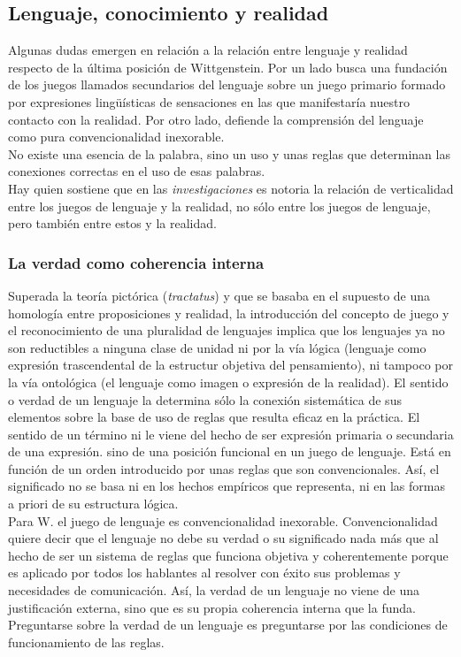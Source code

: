 \documentclass[a4paper, 11pt, twocolumn, spanish]{article}
\begin{document}
\subsection{Lenguaje, conocimiento y realidad}
\label{sec:org9010ed5}
Algunas dudas emergen en relación a la relación entre lenguaje y
realidad respecto de la última posición de Wittgenstein. Por un lado
busca una fundación de los juegos llamados secundarios del lenguaje
sobre un juego primario formado por expresiones lingüísticas de
sensaciones en las que manifestaría nuestro contacto con la
realidad. Por otro lado, defiende la comprensión del lenguaje como
pura convencionalidad inexorable.\\

No existe una esencia de la palabra, sino un uso y unas reglas que
determinan las conexiones correctas en el uso de esas palabras.\\

Hay quien sostiene que en las \emph{investigaciones} es notoria la relación
de verticalidad entre los juegos de lenguaje y la realidad, no sólo
entre los juegos de lenguaje, pero también entre estos y la realidad.

\subsubsection{La verdad como coherencia interna}
\label{sec:orgb2b2f4d}
Superada la teoría pictórica (\emph{tractatus}) y que se basaba en el
supuesto de una homología entre proposiciones y realidad, la
introducción del concepto de juego y el reconocimiento de una
pluralidad de lenguajes implica que los lenguajes ya no son
reductibles a ninguna clase de unidad ni por la vía lógica (lenguaje
como expresión trascendental de la estructur objetiva del
pensamiento), ni tampoco por la vía ontológica (el lenguaje como
imagen o expresión de la realidad). El sentido o verdad de un lenguaje
la determina sólo la conexión sistemática de sus elementos sobre la
base de uso de reglas que resulta eficaz en la práctica. El sentido de
un término ni le viene del hecho de ser expresión primaria o
secundaria de una expresión. sino de una posición funcional en un
juego de lenguaje. Está en función de un orden introducido por unas
reglas que son convencionales. Así, el significado no se basa ni en
los hechos empíricos que representa, ni en las formas a priori de su
estructura lógica.\\

Para W.  el juego de lenguaje es convencionalidad
inexorable. Convencionalidad quiere decir que el lenguaje no debe su
verdad o su significado nada más que al hecho de ser un sistema de
reglas que funciona objetiva y coherentemente porque es aplicado por
todos los hablantes al resolver con éxito sus problemas y necesidades
de comunicación. Así, la verdad de un lenguaje no viene de una
justificación externa, sino que es su propia coherencia interna que la
funda. Preguntarse sobre la verdad de un lenguaje es preguntarse por
las condiciones de funcionamiento de las reglas.\\
\end{document}
